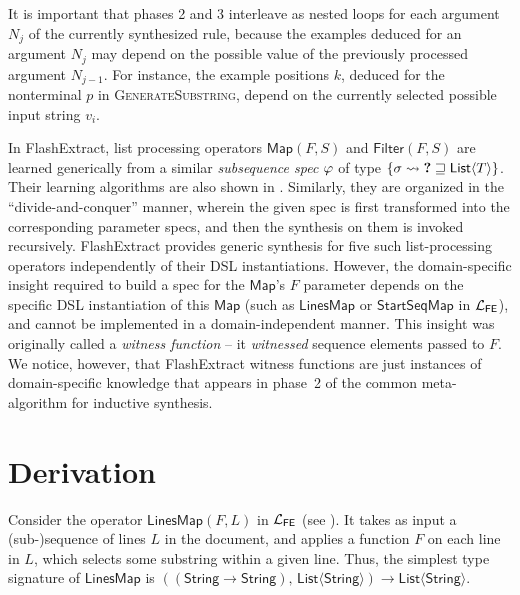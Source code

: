 It is important that phases 2 and 3 interleave as nested loops for each argument $N_j$ of the currently synthesized
rule, because the examples deduced for an argument $N_{j}$ may depend on the possible value of the
previously processed argument $N_{j-1}$.
For instance, the example positions $k$, deduced for the nonterminal $p$ in \textsc{GenerateSubstring}, depend on the
currently selected possible input string $v_i$.

In FlashExtract, list processing operators $\mathsf{Map}(F, S)$ and $\mathsf{Filter}(F, S)$ are learned generically from
a similar \emph{subsequence spec} $\varphi$ of type $\{ \sigma \rightsquigarrow \textbf{?} \sqsupseteq
\mathsf{List}\langle T\rangle \}$.
Their learning algorithms are also shown in .
Similarly, they are organized in the ``divide-and-conquer'' manner, wherein the given spec is first transformed
into the corresponding parameter specs, and then the synthesis on them is invoked recursively.
FlashExtract provides generic synthesis for five such list\hyp{}processing operators independently of their DSL
instantiations.
However, the domain-specific insight required to build a spec for the $\mathsf{Map}$'s $F$ parameter depends on
the specific DSL instantiation of this $\mathsf{Map}$ (such as $\mathsf{LinesMap}$ or $\mathsf{StartSeqMap}$ in
$\mathcal{L}_{\mathsf{FE}}$), and cannot be implemented in a domain-independent manner.
This insight was originally called a \emph{witness function} -- it \emph{witnessed} sequence elements passed to $F$.
We notice, however, that FlashExtract witness functions are just instances of domain-specific knowledge that
appears in phase~2 of the common meta-algorithm for inductive synthesis.

\section{Derivation}
Consider the operator $\mathsf{LinesMap}(F, L)$ in $\mathcal{L}_{\mathsf{FE}}$ (see ).
It takes as input a \mbox{(sub-)sequence} of lines $L$ in the document, and applies a function $F$ on each line in $L$,
which selects some substring within a given line.
Thus, the simplest type signature of $\mathsf{LinesMap}$ is \mbox{$\left((\mathsf{String} \!\to\!
\mathsf{String}),\, \mathsf{List}\langle\mathsf{String}\rangle\right) \to \mathsf{List}\langle \mathsf{String}
    \rangle$}.

